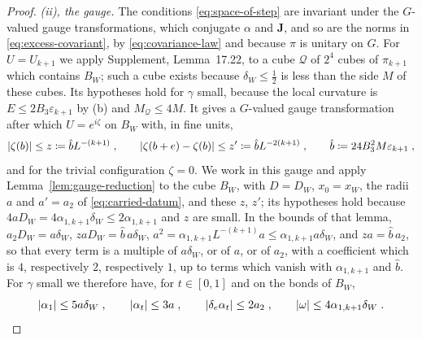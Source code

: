 \begin{proof}
\emph{(ii), the gauge.} The conditions \eqref{eq:space-of-step} are invariant under the $G$-valued gauge transformations, which conjugate $\alpha$ and $\mathbf J$, and so are the norms in \eqref{eq:excess-covariant}, by \eqref{eq:covariance-law} and because $\pi$ is unitary on $G$. For $U = U_{k+1}$ we apply Supplement, Lemma~17.22, to a cube $\mathcal Q$ of $2^4$ cubes of $\pi_{k+1}$ which contains $B_W$; such a cube exists because $\delta_W \leq \frac12$ is less than the side $M$ of these cubes. Its hypotheses hold for $\gamma$ small, because the local curvature is $E \leq 2B_3\varepsilon_{k+1}$ by (b) and $M_{\mathcal Q} \leq 4M$. It gives a $G$-valued gauge transformation after which $U = e^{i\zeta}$ on $B_W$ with, in fine units,
\[
    \lvert\zeta(b)\rvert \leq z \coloneqq \hat bL^{-(k+1)}\;,
    \qquad
    \lvert\zeta(b + e) - \zeta(b)\rvert \leq z' \coloneqq \hat bL^{-2(k+1)}\;,
    \qquad
    \hat b \coloneqq 24B_3^2M\varepsilon_{k+1}\;,
\]
and for the trivial configuration $\zeta = 0$. We work in this gauge and apply Lemma~\ref{lem:gauge-reduction} to the cube $B_W$, with $D = D_W$, $x_0 = x_W$, the radii $a$ and $a' = a_2$ of \eqref{eq:carried-datum}, and these $z$, $z'$; its hypotheses hold because $4aD_W = 4\alpha_{1,k+1}\delta_W \leq 2\alpha_{1,k+1}$ and $z$ are small. In the bounds of that lemma, $a_2D_W = a\delta_W$, $zaD_W = \hat b\,a\delta_W$, $a^2 = \alpha_{1,k+1}L^{-(k+1)}a \leq \alpha_{1,k+1}a\delta_W$, and $za = \hat b\,a_2$, so that every term is a multiple of $a\delta_W$, or of $a$, or of $a_2$, with a coefficient which is $4$, respectively $2$, respectively $1$, up to terms which vanish with $\alpha_{1,k+1}$ and $\hat b$. For $\gamma$ small we therefore have, for $t \in [0, 1]$ and on the bonds of $B_W$,
\begin{equation}\label{eq:reduced-datum}
    \lvert\alpha_1\rvert \leq 5a\delta_W\;,
    \qquad
    \lvert\alpha_t\rvert \leq 3a\;,
    \qquad
    \lvert\delta_e\alpha_t\rvert \leq 2a_2\;,
    \qquad
    \lvert\omega\rvert \leq 4\alpha_{1,k+1}\delta_W\;.
\end{equation}


\end{proof}
